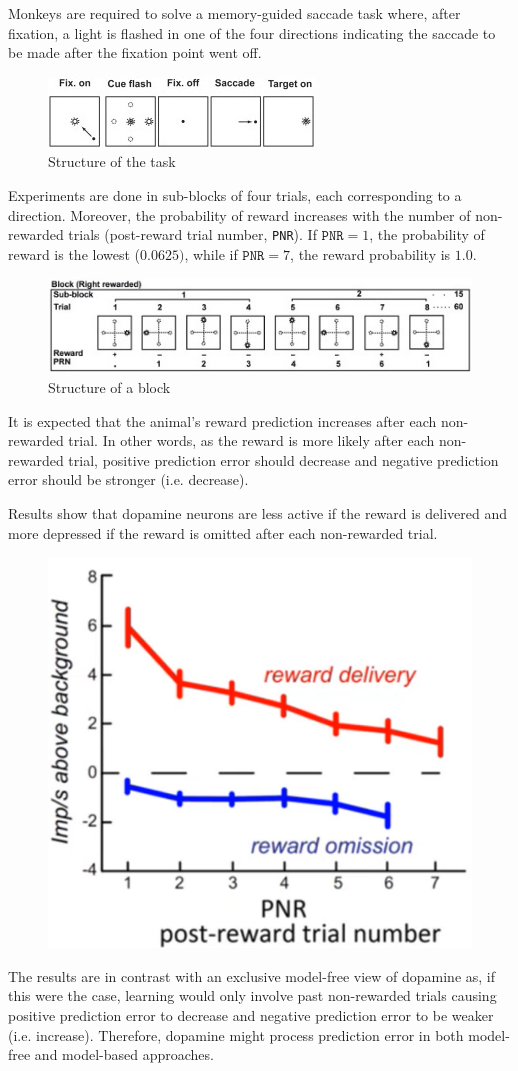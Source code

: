 \begin{casestudy}
    Monkeys are required to solve a memory-guided saccade task where, after fixation, 
    a light is flashed in one of the four directions indicating the saccade to be made after the fixation point went off.
    \begin{figure}[H]
        \centering
        \includegraphics[width=0.4\linewidth]{./img/saccade1.png}
        \caption{Structure of the task}
    \end{figure}

    Experiments are done in sub-blocks of four trials, each corresponding to a direction.
    Moreover, the probability of reward increases with the number of non-rewarded trials (post-reward trial number, \texttt{PNR}).
    If $\texttt{PNR} = 1$, the probability of reward is the lowest ($0.0625)$, while if $\texttt{PNR} = 7$, the reward probability is $1.0$.
    \begin{figure}[H]
        \centering
        \includegraphics[width=0.6\linewidth]{./img/saccade2.png}
        \caption{Structure of a block}
    \end{figure}


    It is expected that the animal's reward prediction increases after each non-rewarded trial.
    In other words, as the reward is more likely after each non-rewarded trial, positive prediction error should decrease and 
    negative prediction error should be stronger (i.e. decrease).

    Results show that dopamine neurons are less active if the reward is delivered
    and more depressed if the reward is omitted after each non-rewarded trial.
    \begin{figure}[H]
        \centering
        \includegraphics[width=0.25\linewidth]{./img/saccade3.png}
    \end{figure}

    The results are in contrast with an exclusive model-free view of dopamine as, if this were the case, 
    learning would only involve past non-rewarded trials causing positive prediction error to decrease and negative prediction error to be weaker (i.e. increase).
    Therefore, dopamine might process prediction error in both model-free and model-based approaches.
\end{casestudy}

